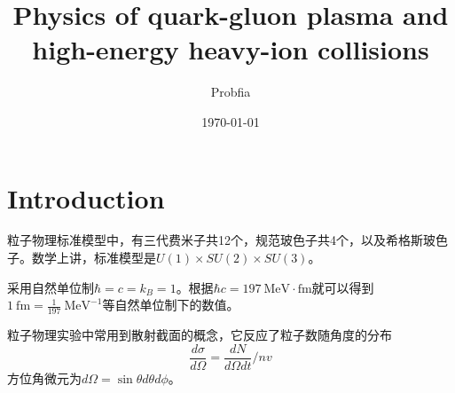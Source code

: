 \documentclass[a4paper,11pt]{ctexart}
\title{Physics of quark-gluon plasma and high-energy heavy-ion collisions}
\author{Probfia}
\date{\today}
\newcommand{\beq}{\begin{equation}}
\newcommand{\eeq}{\end{equation}}
\newcommand{\unit}[1]{\mathrm{\ #1}}
\begin{document}
\maketitle
\tableofcontents
\section{Introduction}
粒子物理标准模型中，有三代费米子共12个，规范玻色子共4个，以及希格斯玻色子。数学上讲，标准模型是$U(1)\times SU(2) \times SU(3)$。\par
采用自然单位制$\hbar = c = k_B = 1$。根据$\hbar c = 197\unit{MeV \cdot fm}$就可以得到$1\unit{fm} = \frac{1}{197}\unit{MeV^{-1}}$等自然单位制下的数值。\par
粒子物理实验中常用到散射截面的概念，它反应了粒子数随角度的分布
\beq
\frac{d \sigma}{d \varOmega} = \frac{dN}{d\varOmega dt}/nv
\eeq
方位角微元为$d\varOmega = \sin \theta d \theta d \phi$。
\end{document}
